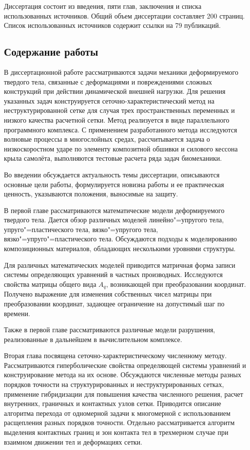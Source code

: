 Диссертация состоит из введения, пяти глав, заключения и списка использованных источников. Общий объем диссертации составляет 200 страниц. Список использованных источников содержит ссылки на 79 публикаций.

\subsection*{Содержание работы}

В диссертационной работе рассматриваются задачи механики деформируемого твердого тела, связанные с деформациями и повреждениями сложных конструкций при действии динамической внешней нагрузки. Для решения указанных задач конструируется сеточно-характеристический метод на неструктурированной сетке для случая трех пространственных переменных и низкого качества расчетной сетки. Метод реализуется в виде параллельного программного комплекса. С применением разработанного метода исследуются волновые процессы в многослойных средах, рассчитывается задача о низкоскоростном ударе по элементу композитной обшивки и силового кессона крыла самолёта, выполняются тестовые расчета ряда задач биомеханики.

Во введении обсуждается актуальность темы диссертации, описываются основные цели работы, формулируется новизна работы и ее практическая ценность, указываются положения, выносимые на защиту.

В первой главе рассматриваются математические модели деформируемого твердого тела. Дается обзор различных моделей линейно"=упругого тела, упруго"=пластического тела, вязко"=упругого тела, вязко"=упруго"=пластического тела. Обсуждаются подходы к моделированию композиционных материалов, обладающих несколькими уровнями структуры.

Для различных математических моделей приводится матричная форма записи системы определяющих уравнений в частных производных. Исследуются свойства матрицы общего вида $A_q$, возникающей при преобразовании координат. Получено выражение для изменения собственных чисел матрицы при преобразовании координат, задающее ограничение на допустимый шаг по времени.

Также в первой главе рассматриваются различные модели разрушения, реализованные в дальнейшем в вычислительном комплексе.

Вторая глава посвящена сеточно-характеристическому численному методу. Рассматриваются гиперболические свойства определяющей системы уравнений и конструирование метода на их основе. Обсуждаются численные методы разных порядков точности на структурированных и неструктурированных сетках, применение гибридизации для повышения качества численного решения, расчет внутренних, граничных и контактных узлов сетки. Приводится описание алгоритма перехода от одномерной задачи к многомерной с использованием расщепления разных порядков точности. Отдельно рассматривается алгоритм выделения контактных границ и зон контакта тел в трехмерном случае при взаимном движении тел и деформациях сетки.

